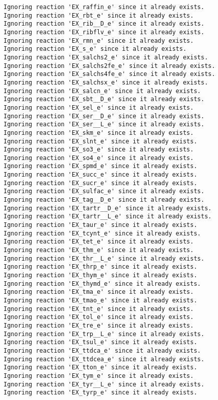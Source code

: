 \documentclass[
  letterpaper,
  DIV=11,
  numbers=noendperiod]{scrartcl}
\begin{document}
\begin{verbatim}
Ignoring reaction 'EX_raffin_e' since it already exists.
Ignoring reaction 'EX_rbt_e' since it already exists.
Ignoring reaction 'EX_rib__D_e' since it already exists.
Ignoring reaction 'EX_ribflv_e' since it already exists.
Ignoring reaction 'EX_rmn_e' since it already exists.
Ignoring reaction 'EX_s_e' since it already exists.
Ignoring reaction 'EX_salchs2_e' since it already exists.
Ignoring reaction 'EX_salchs2fe_e' since it already exists.
Ignoring reaction 'EX_salchs4fe_e' since it already exists.
Ignoring reaction 'EX_salchsx_e' since it already exists.
Ignoring reaction 'EX_salcn_e' since it already exists.
Ignoring reaction 'EX_sbt__D_e' since it already exists.
Ignoring reaction 'EX_sel_e' since it already exists.
Ignoring reaction 'EX_ser__D_e' since it already exists.
Ignoring reaction 'EX_ser__L_e' since it already exists.
Ignoring reaction 'EX_skm_e' since it already exists.
Ignoring reaction 'EX_slnt_e' since it already exists.
Ignoring reaction 'EX_so3_e' since it already exists.
Ignoring reaction 'EX_so4_e' since it already exists.
Ignoring reaction 'EX_spmd_e' since it already exists.
Ignoring reaction 'EX_succ_e' since it already exists.
Ignoring reaction 'EX_sucr_e' since it already exists.
Ignoring reaction 'EX_sulfac_e' since it already exists.
Ignoring reaction 'EX_tag__D_e' since it already exists.
Ignoring reaction 'EX_tartr__D_e' since it already exists.
Ignoring reaction 'EX_tartr__L_e' since it already exists.
Ignoring reaction 'EX_taur_e' since it already exists.
Ignoring reaction 'EX_tcynt_e' since it already exists.
Ignoring reaction 'EX_tet_e' since it already exists.
Ignoring reaction 'EX_thm_e' since it already exists.
Ignoring reaction 'EX_thr__L_e' since it already exists.
Ignoring reaction 'EX_thrp_e' since it already exists.
Ignoring reaction 'EX_thym_e' since it already exists.
Ignoring reaction 'EX_thymd_e' since it already exists.
Ignoring reaction 'EX_tma_e' since it already exists.
Ignoring reaction 'EX_tmao_e' since it already exists.
Ignoring reaction 'EX_tnt_e' since it already exists.
Ignoring reaction 'EX_tol_e' since it already exists.
Ignoring reaction 'EX_tre_e' since it already exists.
Ignoring reaction 'EX_trp__L_e' since it already exists.
Ignoring reaction 'EX_tsul_e' since it already exists.
Ignoring reaction 'EX_ttdca_e' since it already exists.
Ignoring reaction 'EX_ttdcea_e' since it already exists.
Ignoring reaction 'EX_tton_e' since it already exists.
Ignoring reaction 'EX_tym_e' since it already exists.
Ignoring reaction 'EX_tyr__L_e' since it already exists.
Ignoring reaction 'EX_tyrp_e' since it already exists.

\end{verbatim}
\end{document}
